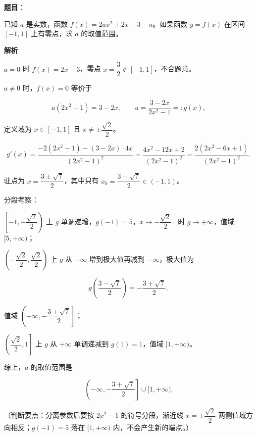 \begin{answer}

\textbf{题目}：

已知 $a$ 是实数，函数 $f(x)=2ax^2+2x-3-a$。如果函数 $y=f(x)$ 在区间 $[-1,1]$ 上有零点，求 $a$ 的取值范围。

\textbf{解析}

$a=0$ 时 $f(x)=2x-3$，零点 $x=\dfrac32\notin[-1,1]$，不合题意。

$a\neq0$ 时，$f(x)=0$ 等价于

\nopagebreak[4]
\[a(2x^2-1)=3-2x,\qquad a=\frac{3-2x}{2x^2-1}=:g(x),\]

定义域为 $x\in[-1,1]$ 且 $x\neq\pm\dfrac{\sqrt2}{2}$。

\nopagebreak[4]
\[g'(x)=\frac{-2(2x^2-1)-(3-2x)\cdot4x}{(2x^2-1)^2}=\frac{4x^2-12x+2}{(2x^2-1)^2}=\frac{2(2x^2-6x+1)}{(2x^2-1)^2}.\]

驻点为 $x=\dfrac{3\pm\sqrt7}{2}$，其中只有 $x_0=\dfrac{3-\sqrt7}{2}\in(-1,1)$。

分段考察：

$\left[-1,-\dfrac{\sqrt2}{2}\right)$ 上 $g$ 单调递增，$g(-1)=5$，$x\to-\dfrac{\sqrt2}{2}^-$ 时 $g\to+\infty$，值域 $[5,+\infty)$；

$\left(-\dfrac{\sqrt2}{2},\dfrac{\sqrt2}{2}\right)$ 上 $g$ 从 $-\infty$ 增到极大值再减到 $-\infty$，极大值为

\nopagebreak[4]
\[g\left(\frac{3-\sqrt7}{2}\right)=-\frac{3+\sqrt7}{2},\]

值域 $\left(-\infty,-\dfrac{3+\sqrt7}{2}\right]$；

$\left(\dfrac{\sqrt2}{2},1\right]$ 上 $g$ 从 $+\infty$ 单调递减到 $g(1)=1$，值域 $[1,+\infty)$。

综上，$a$ 的取值范围是

\nopagebreak[4]
\[\left(-\infty,-\frac{3+\sqrt7}{2}\right]\cup[1,+\infty).\]

（判断要点：分离参数后要按 $2x^2-1$ 的符号分段，渐近线 $x=\pm\dfrac{\sqrt2}{2}$ 两侧值域方向相反；$g(-1)=5$ 落在 $[1,+\infty)$ 内，不会产生新的端点。）


\end{answer}